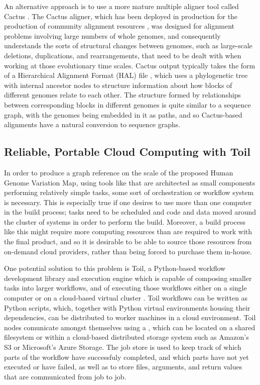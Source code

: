 An alternative approach is to use a more mature multiple aligner tool called Cactus \cite{paten2011cactus2}. The Cactus aligner, which has been deployed in production for the production of community alignment resources \cite{howe2015wormbase}, was designed for alignment problems involving large numbers of whole genomes, and consequently understands the sorts of structural changes between genomes, such as large-scale deletions, duplications, and rearrangements, that need to be dealt with when working at those evolutionary time scales. Cactus output typically takes the form of a Hierarchical Alignment Format (HAL) file \cite{hickey2013hal,howe2015wormbase}, which uses a phylogenetic tree with internal ancestor nodes to structure information about how blocks of different genomes relate to each other. The structure formed by relationships between corresponding blocks in different genomes is quite similar to a sequence graph, with the genomes being embedded in it as paths, and so Cactus-based alignments have a natural conversion to sequence graphs.

\subsection{Reliable, Portable Cloud Computing with Toil}


In order to produce a graph reference on the scale of the proposed Human Genome Variation Map, using tools like \vg that are architected as small components performing relatively simple tasks, some sort of orchestration or workflow system is necessary. This is especially true if one desires to use more than one computer in the build process; tasks need to be scheduled and code and data moved around the cluster of systems in order to perform the build. Moreover, a build process like this might require more computing resources than are required to work with the final product, and so it is desirable to be able to source those resources from on-demand cloud providers, rather than being forced to purchase them in-house.

One potential solution to this problem is Toil, a Python-based workflow development library and execution engine which is capable of composing smaller tasks into larger workflows, and of executing those workflows either on a single computer or on a cloud-based virtual cluster \cite{vivian2017toil}. Toil workflows can be written as Python scripts, which, together with Python virtual environments housing their dependencies, can be distributed to worker machines in a cloud environment. Toil nodes comunicate amongst themselves using a , which can be located on a shared filesystem or within a cloud-based distributed storage system such as Amazon's S3 or Microsoft's Azure Storage. The job store is used to keep track of which parts of the workflow have successfuly completed, and which parts have not yet executed or have failed, as well as to store files, arguments, and return values that are communicated from job to job.

